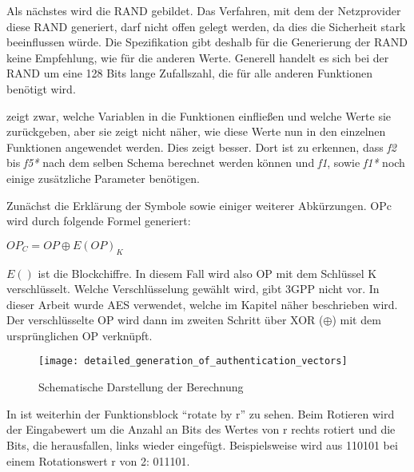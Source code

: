  Als nächstes wird die RAND gebildet. Das Verfahren, mit dem der Netzprovider diese RAND
 generiert, darf nicht offen gelegt werden, da dies die Sicherheit stark beeinflussen würde. Die
 Spezifikation gibt deshalb für die Generierung der RAND keine Empfehlung, wie für die anderen
 Werte. Generell handelt es sich bei der RAND um eine 128 Bits lange Zufallszahl, die für alle
 anderen Funktionen benötigt wird.
 
  zeigt zwar, welche Variablen in die Funktionen einfließen und
 welche Werte sie zurückgeben, aber sie zeigt nicht näher, wie diese Werte nun in den einzelnen
 Funktionen angewendet werden. Dies zeigt  besser. Dort ist
 zu erkennen, dass \emph{f2} bis \emph{f5*} nach dem selben Schema berechnet werden können und
 \emph{f1}, sowie \emph{f1*} noch einige zusätzliche Parameter benötigen.
 
 Zunächst die Erklärung der Symbole sowie einiger weiterer Abkürzungen. OPc wird durch
 folgende Formel generiert:
 \begin{center}
  $OP_{C} = OP \oplus E(OP)_{K}$
 \end{center}
 
 $E()$ ist die Blockchiffre. In diesem Fall wird also \ac{OP} mit dem Schlüssel K
 verschlüsselt. Welche Verschlüsselung gewählt wird, gibt 3GPP nicht vor. In
 dieser Arbeit wurde \ac{AES} verwendet, welche im Kapitel  näher beschrieben wird. \\
 Der verschlüsselte OP wird dann im zweiten Schritt über XOR ($\oplus$) mit dem ursprünglichen
 OP verknüpft.
 
 \begin{figure}[ht]
  \begin{center}
   \texttt{[image: detailed\_generation\_of\_authentication\_vectors]}
  \end{center}
  \caption[Schematische Darstellung der Berechnung der Authentifizierungsvektoren]{Schematische Darstellung der Berechnung \cite{3gpp.33.102}}
  \label{fig:schematisch_milenage}
 \end{figure}
 
 In  ist weiterhin der Funktionsblock ``rotate by r'' zu sehen.
 Beim Rotieren wird der Eingabewert um die Anzahl an Bits des Wertes von r rechts rotiert und
 die Bits, die herausfallen, links wieder eingefügt. Beispielsweise wird aus 110101 bei einem
 Rotationswert r von 2: 011101.
 
